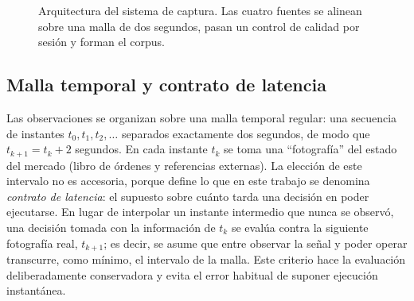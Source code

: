 \begin{figure}[h]
\centering
{}
\caption{Arquitectura del sistema de captura. Las cuatro fuentes se alinean sobre una malla
de dos segundos, pasan un control de calidad por sesión y forman el corpus.}
\label{fig:captura}
\end{figure}

\subsection{Malla temporal y contrato de latencia}

Las observaciones se organizan sobre una malla temporal regular: una secuencia de instantes
$t_0, t_1, t_2, \dots$ separados exactamente dos segundos, de modo que $t_{k+1} = t_k + 2$
segundos. En cada instante $t_k$ se toma una ``fotografía'' del estado del mercado (libro de
órdenes y referencias externas). La elección de este intervalo no es accesoria, porque define
lo que en este trabajo se denomina \emph{contrato de latencia}: el supuesto sobre cuánto
tarda una decisión en poder ejecutarse. En lugar de interpolar un instante intermedio que
nunca se observó, una decisión tomada con la información de $t_k$ se evalúa contra la
siguiente fotografía real, $t_{k+1}$; es decir, se asume que entre observar la señal y poder
operar transcurre, como mínimo, el intervalo de la malla. Este criterio hace la evaluación
deliberadamente conservadora y evita el error habitual de suponer ejecución instantánea.

